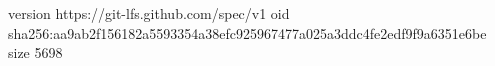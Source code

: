 version https://git-lfs.github.com/spec/v1
oid sha256:aa9ab2f156182a5593354a38efc925967477a025a3ddc4fe2edf9f9a6351e6be
size 5698
